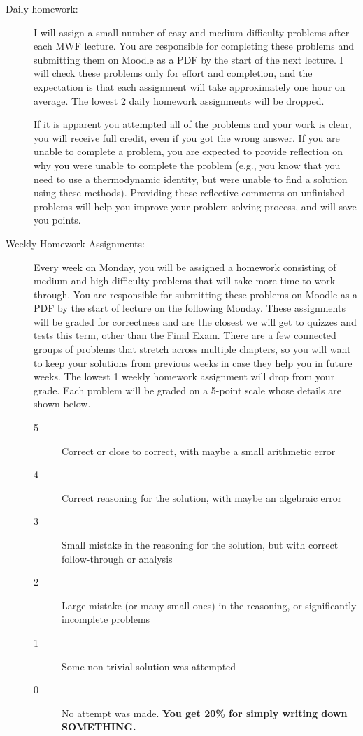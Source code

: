 \documentclass[12pt]{article}
\begin{document}
\begin{description}
\item[Daily homework:] I will assign a small number of easy and medium-difficulty problems after each MWF lecture. You are responsible for completing these problems and submitting them on Moodle as a PDF by the start of the next lecture. I will check these problems only for effort and completion, and the expectation is that each assignment will take approximately one hour on average. The lowest 2 daily homework assignments will be dropped.

  If it is apparent you attempted all of the problems and your work is clear, you will receive full credit, even if you got the wrong answer. If you are unable to complete a problem, you are expected to provide reflection on why you were unable to complete the problem (e.g., you know that you need to use a thermodynamic identity, but were unable to find a solution using these methods). Providing these reflective comments on unfinished problems will help you improve your problem-solving process, and will save you points.

\item[Weekly Homework Assignments:] Every week on Monday, you will be assigned a homework consisting of medium and high-difficulty problems that will take more time to work through. You are responsible for submitting these problems on Moodle as a PDF by the start of lecture on the following Monday. These assignments will be graded for correctness and are the closest we will get to quizzes and tests this term, other than the Final Exam. There are a few connected groups of problems that stretch across multiple chapters, so you will want to keep your solutions from previous weeks in case they help you in future weeks. The lowest 1 weekly homework assignment will drop from your grade. Each problem will be graded on a 5-point scale whose details are shown below.

  \begin{description}
  \item[5] Correct or close to correct, with maybe a small arithmetic error
  \item[4] Correct reasoning for the solution, with maybe an algebraic error
  \item[3] Small mistake in the reasoning for the solution, but with correct follow-through or analysis
  \item[2] Large mistake (or many small ones) in the reasoning, or significantly incomplete problems
  \item[1] Some non-trivial solution was attempted
    \item[0] No attempt was made. \textbf{You get 20\% for simply writing down SOMETHING.}
    \end{description}


\end{description}
\end{document}
